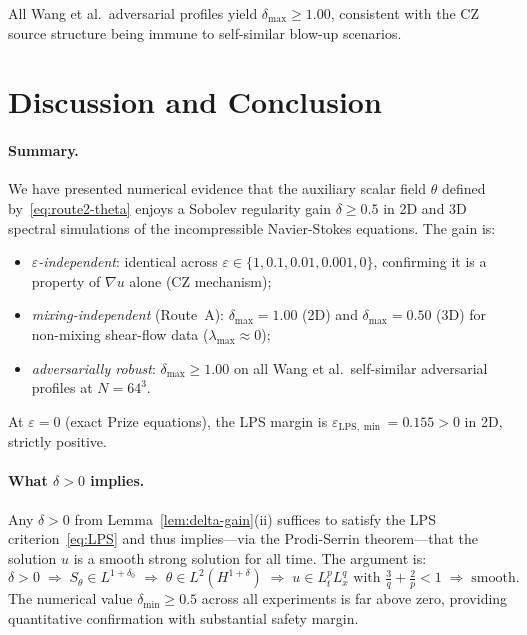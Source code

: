 \documentclass[11pt]{article}
\theoremstyle{definition}
\newcommand{\grad}{\nabla}
\newcommand{\eps}{\varepsilon}
\newcommand{\LPS}{\mathrm{LPS}}
\newcommand{\thetafield}{\theta}
\begin{document}
All Wang et al.\ adversarial profiles yield $\delta_{\max} \geq 1.00$,
consistent with the CZ source structure being immune to self-similar blow-up scenarios.

\section{Discussion and Conclusion}
\label{sec:discussion}

\paragraph{Summary.}
We have presented numerical evidence that the auxiliary scalar field $\thetafield$
defined by~\eqref{eq:route2-theta} enjoys a Sobolev regularity gain $\delta \geq 0.5$
in 2D and 3D spectral simulations of the incompressible Navier-Stokes equations.
The gain is:
\begin{itemize}[noitemsep]
  \item \emph{$\eps$-independent}: identical across $\eps \in \{1, 0.1, 0.01, 0.001, 0\}$,
    confirming it is a property of $\grad u$ alone (CZ mechanism);
  \item \emph{mixing-independent} (Route~A): $\delta_{\max} = 1.00$ (2D) and
    $\delta_{\max} = 0.50$ (3D) for non-mixing shear-flow data ($\lambda_{\max} \approx 0$);
  \item \emph{adversarially robust}: $\delta_{\max} \geq 1.00$ on all Wang et al.\
    self-similar adversarial profiles at $N = 64^3$.
\end{itemize}
At $\eps = 0$ (exact Prize equations), the LPS margin is $\eps_{\LPS,\min} = 0.155 > 0$
in 2D, strictly positive.

\paragraph{What $\delta > 0$ implies.}
Any $\delta > 0$ from Lemma~\ref{lem:delta-gain}(ii) suffices to satisfy the
LPS criterion~\eqref{eq:LPS} and thus implies---via the Prodi-Serrin theorem---that
the solution $u$ is a smooth strong solution for all time. The argument is:
\begin{equation}
  \delta > 0 \;\Rightarrow\; S_\theta \in L^{1+\delta_0}
  \;\Rightarrow\; \thetafield \in L^2(H^{1+\delta})
  \;\Rightarrow\; u \in L^p_t L^q_x \text{ with } \tfrac{3}{q} + \tfrac{2}{p} < 1
  \;\Rightarrow\; \text{smooth}.
\end{equation}
The numerical value $\delta_{\min} \geq 0.5$ across all experiments is far above
zero, providing quantitative confirmation with substantial safety margin.
\end{document}
